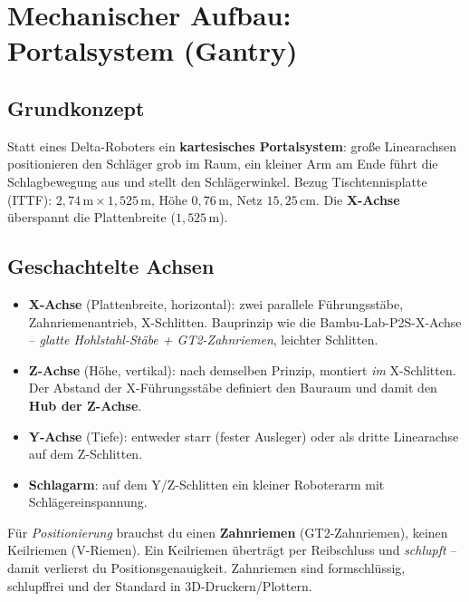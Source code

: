 
\chapter{Mechanischer Aufbau: Portalsystem (Gantry)}

\section{Grundkonzept}
Statt eines Delta-Roboters ein \textbf{kartesisches Portalsystem}: große
Linearachsen positionieren den Schläger grob im Raum, ein kleiner Arm am Ende
führt die Schlagbewegung aus und stellt den Schlägerwinkel. Bezug
Tischtennisplatte (ITTF): $2{,}74\,\text{m} \times 1{,}525\,\text{m}$, Höhe
$0{,}76\,\text{m}$, Netz $15{,}25\,\text{cm}$. Die \textbf{X-Achse} überspannt
die Plattenbreite ($1{,}525\,\text{m}$).

\section{Geschachtelte Achsen}
\begin{itemize}
\item \textbf{X-Achse} (Plattenbreite, horizontal): zwei parallele
  Führungsstäbe, Zahnriemenantrieb, X-Schlitten. Bauprinzip wie die
  Bambu-Lab-P2S-X-Achse -- \emph{glatte Hohlstahl-Stäbe + GT2-Zahnriemen},
  leichter Schlitten.
\item \textbf{Z-Achse} (Höhe, vertikal): nach demselben Prinzip, montiert
  \emph{im} X-Schlitten. Der Abstand der X-Führungsstäbe definiert den Bauraum
  und damit den \textbf{Hub der Z-Achse}.
\item \textbf{Y-Achse} (Tiefe): entweder starr (fester Ausleger) oder als
  dritte Linearachse auf dem Z-Schlitten.
\item \textbf{Schlagarm}: auf dem Y/Z-Schlitten ein kleiner Roboterarm mit
  Schlägereinspannung.
\end{itemize}

\begin{warnbox}[title={Zahnriemen, nicht Keilriemen}]
Für \emph{Positionierung} brauchst du einen \textbf{Zahnriemen}
(GT2-Zahnriemen), keinen Keilriemen (V-Riemen). Ein Keilriemen überträgt per
Reibschluss und \emph{schlupft} -- damit verlierst du Positionsgenauigkeit.
Zahnriemen sind formschlüssig, schlupffrei und der Standard in 3D-Druckern/Plottern.
\end{warnbox}


